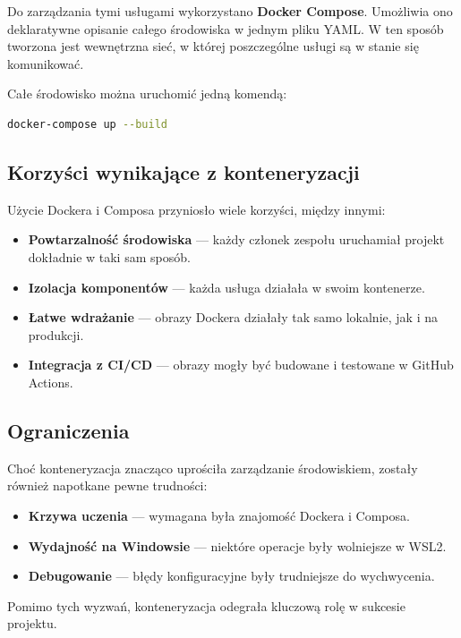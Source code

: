 \pagebreak
Do zarządzania tymi usługami wykorzystano \textbf{Docker Compose}. Umożliwia ono deklaratywne opisanie całego środowiska w jednym pliku YAML. W ten sposób tworzona jest wewnętrzna sieć, w której poszczególne usługi są w stanie się komunikować.

Całe środowisko można uruchomić jedną komendą:

\begin{lstlisting}[language=bash]
docker-compose up --build
\end{lstlisting}

\subsection{Korzyści wynikające z konteneryzacji}

Użycie Dockera i Composa przyniosło wiele korzyści, między innymi:

\begin{itemize}
    \item \textbf{Powtarzalność środowiska} — każdy członek zespołu uruchamiał projekt dokładnie w taki sam sposób.
    \item \textbf{Izolacja komponentów} — każda usługa działała w swoim kontenerze.
    \item \textbf{Łatwe wdrażanie} — obrazy Dockera działały tak samo lokalnie, jak i na produkcji.
    \item \textbf{Integracja z CI/CD} — obrazy mogły być budowane i testowane w GitHub Actions.
\end{itemize}

\subsection{Ograniczenia}

Choć konteneryzacja znacząco uprościła zarządzanie środowiskiem, zostały również napotkane pewne trudności:

\begin{itemize}
    \item \textbf{Krzywa uczenia} — wymagana była znajomość Dockera i Composa.
    \item \textbf{Wydajność na Windowsie} — niektóre operacje były wolniejsze w WSL2.
    \item \textbf{Debugowanie} — błędy konfiguracyjne były trudniejsze do wychwycenia.
\end{itemize}

Pomimo tych wyzwań, konteneryzacja odegrała kluczową rolę w sukcesie projektu.

